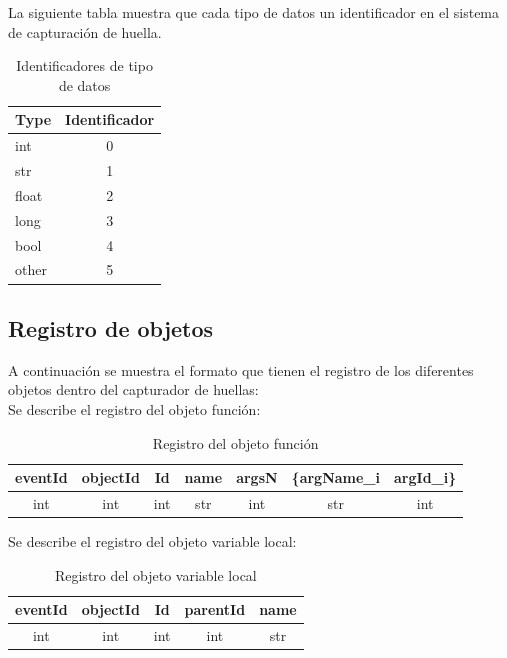 \documentclass[10pt,a4paper]{article}
\begin{document}
La siguiente tabla muestra que cada tipo de datos un identificador en el sistema de capturación de huella.
\begin{table}[!h]
\begin{center}
\begin{tabular}{|l | c |}
\hline
Type & Identificador\\
\hline
int & 0\\
\hline
str & 1\\
\hline
float & 2\\
\hline
long & 3\\
\hline
bool & 4\\
\hline
other & 5\\
\hline
\end{tabular}
\caption{Identificadores de tipo de datos} 
\end{center}
\end{table}

\subsection{Registro de objetos}

A continuación se muestra el formato que tienen el registro de los diferentes objetos dentro del capturador de huellas:\\

Se describe el registro del objeto función:\\

\begin{table}[!h]
\begin{center}
\begin{tabular}{| c | c | c | c | c | c | c |}
\hline
eventId & objectId & Id & name & argsN & \{argName_{i} & argId_{i}\}\\
\hline
int & int & int & str & int & str & int \\
\hline
\end{tabular}
\caption{Registro del objeto función} 
\end{center}
\end{table}


Se describe el registro del objeto variable local:\\

\begin{table}[!h]
\begin{center}
\begin{tabular}{| c | c | c | c | c |}
\hline
eventId & objectId & Id & parentId & name\\
\hline
int & int & int & int & str\\
\hline
\end{tabular}
\caption{Registro del objeto variable local} 
\end{center}
\end{table}
\end{document}

